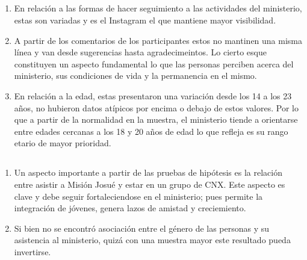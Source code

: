 \documentclass{beamer}
\begin{document}
\subsection{}
\begin{frame}{}
\vspace{-0.9\baselineskip}
\begin{tcolorbox}[colback=backframe_color,colframe=beamer_color,title= Conclusiones] 

\begin{enumerate}
    \item En relación a las formas de hacer seguimiento a las actividades del ministerio, estas son variadas y es el Instagram el que mantiene mayor visibilidad. 
    \item A partir de los comentarios de los participantes estos no mantinen una misma línea y van desde sugerencias hasta agradecimeintos. Lo cierto esque constituyen un aspecto fundamental lo que las personas perciben acerca del ministerio, sus condiciones de vida y la permanencia en el mismo. 
    \item En relación a la edad, estas presentaron una variación desde los 14 a los 23 años, no hubieron datos atípicos por encima o debajo de estos valores. Por lo que a partir de la normalidad en la muestra, el ministerio tiende a orientarse entre edades cercanas a los 18 y 20 años de edad lo que refleja es su rango etario de mayor prioridad. 
\end{enumerate}
\end{tcolorbox}
\end{frame}



\subsection{}
\begin{frame}{}
\vspace{-0.9\baselineskip}
\begin{tcolorbox}[colback=backframe_color,colframe=beamer_color,title= Conclusiones] 

\begin{enumerate}
    \item Un aspecto importante a partir de las pruebas de hipótesis es la relación entre asistir a Misión Josué y estar en un grupo de CNX.  Este aspecto es clave y debe seguir fortaleciendose en el ministerio; pues permite la integración de jóvenes, genera lazos de amistad y creciemiento. 
    \item Si bien no se encontró asociación entre el género de las personas y su asistencia al ministerio, quizá con una muestra mayor este resultado pueda invertirse.   
\end{enumerate}
\end{tcolorbox}
\end{frame}
\end{document}
